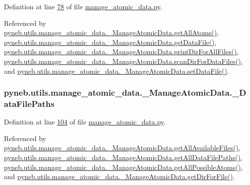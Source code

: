 Definition at line \hyperlink{manage__atomic__data_8py_source_l00078}{78} of file \hyperlink{manage__atomic__data_8py_source}{manage\+\_\+atomic\+\_\+data.\+py}.



Referenced by \hyperlink{manage__atomic__data_8py_source_l00277}{pyneb.\+utils.\+manage\+\_\+atomic\+\_\+data.\+\_\+\+Manage\+Atomic\+Data.\+get\+All\+Atoms()}, \hyperlink{manage__atomic__data_8py_source_l00297}{pyneb.\+utils.\+manage\+\_\+atomic\+\_\+data.\+\_\+\+Manage\+Atomic\+Data.\+get\+Data\+File()}, \hyperlink{manage__atomic__data_8py_source_l00172}{pyneb.\+utils.\+manage\+\_\+atomic\+\_\+data.\+\_\+\+Manage\+Atomic\+Data.\+print\+Dir\+For\+All\+Files()}, \hyperlink{manage__atomic__data_8py_source_l00358}{pyneb.\+utils.\+manage\+\_\+atomic\+\_\+data.\+\_\+\+Manage\+Atomic\+Data.\+scan\+Dir\+For\+Data\+Files()}, and \hyperlink{manage__atomic__data_8py_source_l00380}{pyneb.\+utils.\+manage\+\_\+atomic\+\_\+data.\+\_\+\+Manage\+Atomic\+Data.\+set\+Data\+File()}.

\hypertarget{classpyneb_1_1utils_1_1manage__atomic__data_1_1___manage_atomic_data_a92da10ed6b2395c54f88300c05a71ae9}{}
\subsubsection[{\+\_\+\+Data\+File\+Paths}]{\setlength{\rightskip}{0pt plus 5cm}pyneb.\+utils.\+manage\+\_\+atomic\+\_\+data.\+\_\+\+Manage\+Atomic\+Data.\+\_\+\+Data\+File\+Paths\hspace{0.3cm}{\ttfamily [private]}}\label{classpyneb_1_1utils_1_1manage__atomic__data_1_1___manage_atomic_data_a92da10ed6b2395c54f88300c05a71ae9}


Definition at line \hyperlink{manage__atomic__data_8py_source_l00104}{104} of file \hyperlink{manage__atomic__data_8py_source}{manage\+\_\+atomic\+\_\+data.\+py}.



Referenced by \hyperlink{manage__atomic__data_8py_source_l00190}{pyneb.\+utils.\+manage\+\_\+atomic\+\_\+data.\+\_\+\+Manage\+Atomic\+Data.\+get\+All\+Available\+Files()}, \hyperlink{manage__atomic__data_8py_source_l00136}{pyneb.\+utils.\+manage\+\_\+atomic\+\_\+data.\+\_\+\+Manage\+Atomic\+Data.\+get\+All\+Data\+File\+Paths()}, \hyperlink{manage__atomic__data_8py_source_l00242}{pyneb.\+utils.\+manage\+\_\+atomic\+\_\+data.\+\_\+\+Manage\+Atomic\+Data.\+get\+All\+Possible\+Atoms()}, and \hyperlink{manage__atomic__data_8py_source_l00144}{pyneb.\+utils.\+manage\+\_\+atomic\+\_\+data.\+\_\+\+Manage\+Atomic\+Data.\+get\+Dir\+For\+File()}.

